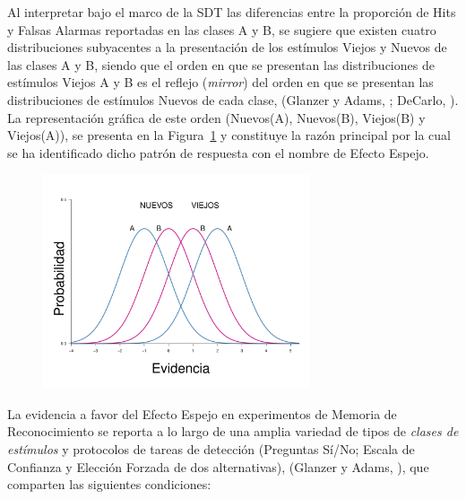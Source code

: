Al interpretar bajo el marco de la SDT las diferencias entre la proporción de Hits y Falsas Alarmas reportadas en las clases A y B, se sugiere que existen cuatro distribuciones subyacentes a la presentación de los estímulos Viejos y Nuevos de las clases A y B, siendo que el orden en que se presentan las distribuciones de estímulos Viejos A y B es el reflejo (\textit{mirror}) del orden en que se presentan las distribuciones de estímulos Nuevos de cada clase, (Glanzer y Adams, \citeyear{Glanzer1990}; DeCarlo, \citeyear{DeCarlo2007}). La representación gráfica de este orden (Nuevos(A), Nuevos(B), Viejos(B) y Viejos(A)), se presenta en la Figura~\ref{fig:Ejem_EfectoEspejo} y constituye la razón principal por la cual se ha identificado dicho patrón de respuesta con el nombre de Efecto Espejo.\\

\begin{figure}[th]
\centering
\includegraphics[width=0.7\textwidth]{Figures/EfectoEspejo}
\caption[Representación gráfica del Efecto Espejo]{}
\label{fig:Ejem_EfectoEspejo}
\end{figure}

La evidencia a favor del Efecto Espejo en experimentos de Memoria de Reconocimiento se reporta a lo largo de una amplia variedad de tipos de \textit{clases de estímulos} y protocolos de tareas de detección (Preguntas Sí/No; Escala de Confianza y Elección Forzada de dos alternativas), (Glanzer y Adams, \citeyear{Glanzer1990}), que comparten las siguientes condiciones:\\

